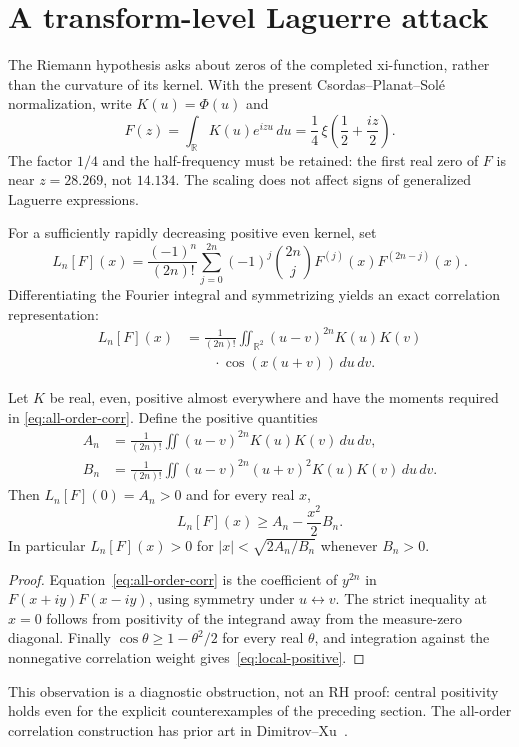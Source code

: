 \section{A transform-level Laguerre attack}\label{sec:transformattack}
The Riemann hypothesis asks about zeros of the completed
xi-function, rather than the curvature of its kernel.
With the present Csordas--Planat--Sol\'e normalization,
write $K(u)=\Phi(u)$ and
\begin{equation}\label{eq:fourier-actual}
F(z)=\int_{\mathbb R}K(u)e^{izu}\,du
     =\frac14\,\xi\!\left(\frac12+\frac{iz}{2}\right).
\end{equation}
The factor $1/4$ and the half-frequency must be retained:
the first real zero of $F$ is near $z=28.269$, not $14.134$.
The scaling does not affect signs of generalized Laguerre
expressions.

For a sufficiently rapidly decreasing positive even kernel,
set
\begin{equation}
L_n[F](x)=\frac{(-1)^n}{(2n)!}
\sum_{j=0}^{2n}(-1)^j {2n\choose j}
F^{(j)}(x)F^{(2n-j)}(x).
\end{equation}
Differentiating the Fourier integral and symmetrizing
yields an exact correlation representation:
\begin{align}\label{eq:all-order-corr}
L_n[F](x)&=\frac{1}{(2n)!}
\iint_{\mathbb R^2}(u-v)^{2n}K(u)K(v)\nonumber\\
&\qquad\cdot\cos(x(u+v))\,du\,dv.
\end{align}

\begin{proposition}
Let $K$ be real, even, positive almost everywhere and have
the moments required in \eqref{eq:all-order-corr}.
Define the positive quantities
\begin{align}
A_n&=\frac{1}{(2n)!}\iint (u-v)^{2n}K(u)K(v)\,du\,dv,\\
B_n&=\frac{1}{(2n)!}\iint (u-v)^{2n}(u+v)^2K(u)K(v)\,du\,dv.
\end{align}
Then $L_n[F](0)=A_n>0$ and for every real $x$,
\begin{equation}\label{eq:local-positive}
L_n[F](x)\ge A_n-\frac{x^2}{2}B_n.
\end{equation}
In particular $L_n[F](x)>0$ for
$|x|<\sqrt{2A_n/B_n}$ whenever $B_n>0$.
\end{proposition}
\begin{proof}
Equation~\eqref{eq:all-order-corr} is the coefficient of
$y^{2n}$ in
$F(x+iy)F(x-iy)$, using symmetry under $u\leftrightarrow v$.
The strict inequality at $x=0$ follows from positivity of
the integrand away from the measure-zero diagonal.
Finally $\cos\theta\ge 1-\theta^2/2$ for every real $\theta$,
and integration against the nonnegative correlation weight
gives~\eqref{eq:local-positive}.
\end{proof}
This observation is a diagnostic obstruction, not an RH
proof: central positivity holds even for the explicit
counterexamples of the preceding section. The all-order
correlation construction has prior art in
Dimitrov--Xu~\cite{DX}.

